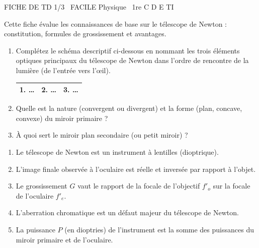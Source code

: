 \documentclass[11pt]{article}
\begin{document}
\begin{tcolorbox}[enhanced,colback=popink,colframe=popink,arc=10pt,boxrule=0pt,left=12pt,right=12pt,top=9pt,bottom=9pt]
{\color{white}\popxbold\small FICHE DE TD 1/3 \textbullet\ FACILE \hfill Physique \textbullet\ 1re C D E TI\par}
\end{tcolorbox}
\vspace{4pt}
Cette fiche évalue les connaissances de base sur le télescope de Newton : constitution, formules de grossissement et avantages.

\begin{exercice}
\label{exo:constitution}
\begin{enumerate}
    \item Complétez le schéma descriptif ci-dessous en nommant les trois éléments optiques principaux du télescope de Newton dans l'ordre de rencontre de la lumière (de l'entrée vers l'œil).
    \begin{center}
        \begin{tabular}{|c|c|c|}
        \hline
        1. \ldots & 2. \ldots & 3. \ldots \\
        \hline
        \end{tabular}
    \end{center}
    \item Quelle est la nature (convergent ou divergent) et la forme (plan, concave, convexe) du miroir primaire ?
    \item À quoi sert le miroir plan secondaire (ou petit miroir) ?
\end{enumerate}
\end{exercice}

\begin{exercice}
\label{exo:vf}
\begin{enumerate}
    \item Le télescope de Newton est un instrument à lentilles (dioptrique).
    \item L'image finale observée à l'oculaire est réelle et inversée par rapport à l'objet.
    \item Le grossissement $G$ vaut le rapport de la focale de l'objectif $f'_o$ sur la focale de l'oculaire $f'_e$.
    \item L'aberration chromatique est un défaut majeur du télescope de Newton.
    \item La puissance $P$ (en dioptries) de l'instrument est la somme des puissances du miroir primaire et de l'oculaire.
\end{enumerate}
\end{exercice}
\end{document}
